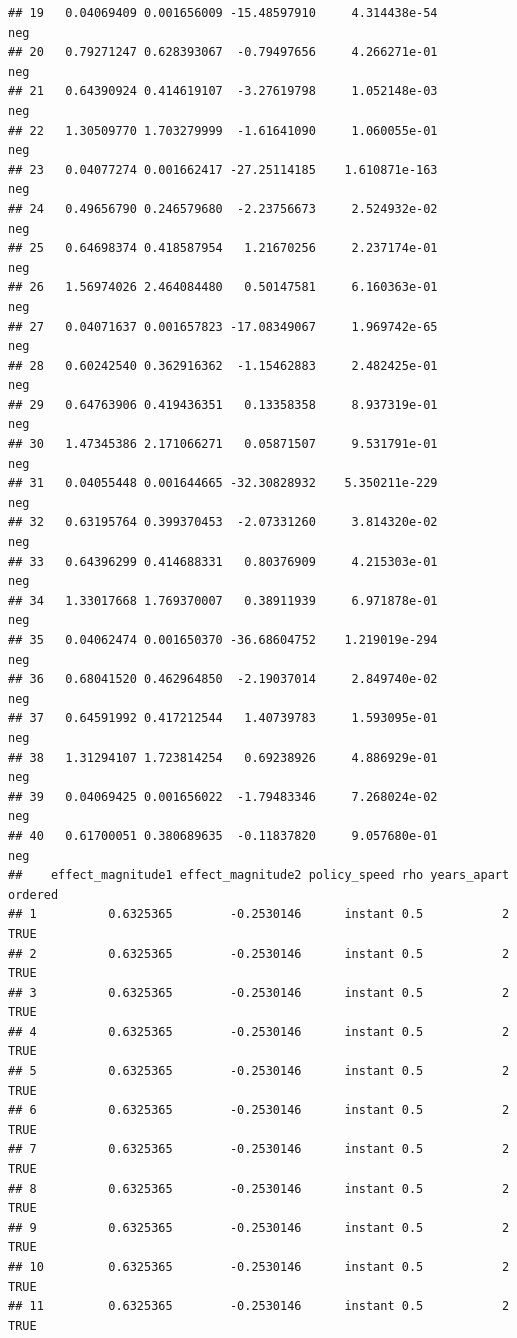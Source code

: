 \documentclass[
]{article}
\begin{document}
\begin{verbatim}
## 19   0.04069409 0.001656009 -15.48597910     4.314438e-54              neg
## 20   0.79271247 0.628393067  -0.79497656     4.266271e-01              neg
## 21   0.64390924 0.414619107  -3.27619798     1.052148e-03              neg
## 22   1.30509770 1.703279999  -1.61641090     1.060055e-01              neg
## 23   0.04077274 0.001662417 -27.25114185    1.610871e-163              neg
## 24   0.49656790 0.246579680  -2.23756673     2.524932e-02              neg
## 25   0.64698374 0.418587954   1.21670256     2.237174e-01              neg
## 26   1.56974026 2.464084480   0.50147581     6.160363e-01              neg
## 27   0.04071637 0.001657823 -17.08349067     1.969742e-65              neg
## 28   0.60242540 0.362916362  -1.15462883     2.482425e-01              neg
## 29   0.64763906 0.419436351   0.13358358     8.937319e-01              neg
## 30   1.47345386 2.171066271   0.05871507     9.531791e-01              neg
## 31   0.04055448 0.001644665 -32.30828932    5.350211e-229              neg
## 32   0.63195764 0.399370453  -2.07331260     3.814320e-02              neg
## 33   0.64396299 0.414688331   0.80376909     4.215303e-01              neg
## 34   1.33017668 1.769370007   0.38911939     6.971878e-01              neg
## 35   0.04062474 0.001650370 -36.68604752    1.219019e-294              neg
## 36   0.68041520 0.462964850  -2.19037014     2.849740e-02              neg
## 37   0.64591992 0.417212544   1.40739783     1.593095e-01              neg
## 38   1.31294107 1.723814254   0.69238926     4.886929e-01              neg
## 39   0.04069425 0.001656022  -1.79483346     7.268024e-02              neg
## 40   0.61700051 0.380689635  -0.11837820     9.057680e-01              neg
##    effect_magnitude1 effect_magnitude2 policy_speed rho years_apart ordered
## 1          0.6325365        -0.2530146      instant 0.5           2    TRUE
## 2          0.6325365        -0.2530146      instant 0.5           2    TRUE
## 3          0.6325365        -0.2530146      instant 0.5           2    TRUE
## 4          0.6325365        -0.2530146      instant 0.5           2    TRUE
## 5          0.6325365        -0.2530146      instant 0.5           2    TRUE
## 6          0.6325365        -0.2530146      instant 0.5           2    TRUE
## 7          0.6325365        -0.2530146      instant 0.5           2    TRUE
## 8          0.6325365        -0.2530146      instant 0.5           2    TRUE
## 9          0.6325365        -0.2530146      instant 0.5           2    TRUE
## 10         0.6325365        -0.2530146      instant 0.5           2    TRUE
## 11         0.6325365        -0.2530146      instant 0.5           2    TRUE

\end{verbatim}
\end{document}

